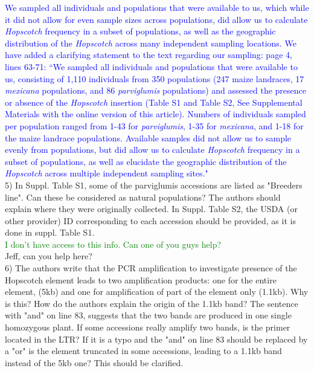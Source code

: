 \documentclass[11pt]{article}
\newcommand{\res}[1]{\noindent \textcolor{blue}{{#1}} \\}
\newcommand{\lev}[1]{\noindent \textcolor{green}{{#1}} \\}
\newcommand{\mbh}[1]{\noindent \textcolor{Dandelion}{{#1}}\\}
\begin{document}
\res{We sampled all individuals and populations that were available to us, which while it did not allow for even sample sizes across populations, did allow us to calculate \emph{Hopscotch} frequency in a subset of populations, as well as the geographic distribution of the \emph{Hopscotch} across many independent sampling locations. We have added a clarifying statement to the text regarding our sampling: page 4, lines 63-71: ``We sampled all individuals and populations that were available to us, consisting of 1,110 individuals from 350 populations (247 maize landraces, 17 \emph{mexicana} populations, and 86 \emph{parviglumis} populations) and assessed the presence or absence of the \emph{Hopscotch} insertion (Table S1 and Table S2, See Supplemental Materials with the online version of this article). Numbers of individuals sampled per population ranged from 1-43 for \emph{parviglumis}, 1-35 for \emph{mexicana}, and 1-18 for the maize landrace populations. Available samples did not allow us to sample evenly from populations, but did allow us to calculate \emph{Hopscotch} frequency in a subset of populations, as well as elucidate the geographic distribution of the \emph{Hopscotch} across multiple independent sampling sites."}

5) In Suppl. Table S1, some of the parviglumis accessions are listed as "Breeders line". Can these be considered as natural populations? The authors should explain where they were originally collected. In Suppl. Table S2, the USDA (or other provider) ID corresponding to each accession should be provided, as it is done in suppl. Table S1.\\

\lev{I don't have access to this info. Can one of you guys help?}

\mbh{Jeff, can you help here?}

6) The authors write that the PCR amplification to investigate presence of the Hopscotch element leads to two amplification products: one for the entire element, (5kb) and one for amplification of part of the element only (1.1kb). Why is this? How do the authors explain the origin of the 1.1kb band? The sentence with "and" on line 83, suggests that the two bands are produced in one single homozygous plant. If some accessions really amplify two bands, is the primer located in the LTR? If it is a typo and the "and" on line 83 should be replaced by a "or" is the element truncated in some accessions, leading to a 1.1kb band instead of the 5kb one? This should be clarified.\\
\end{document}

